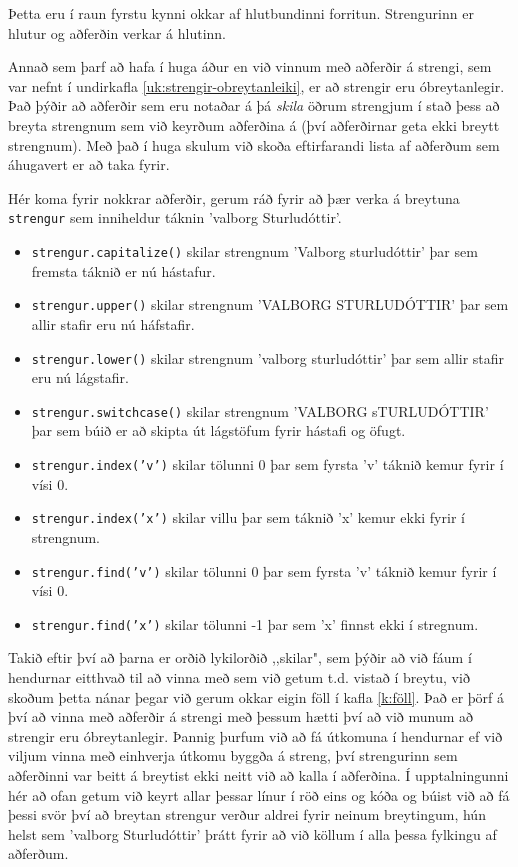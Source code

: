 Þetta eru í raun fyrstu kynni okkar af hlutbundinni forritun.
Strengurinn er hlutur og aðferðin verkar á hlutinn.

Annað sem þarf að hafa í huga áður en við vinnum með aðferðir á strengi, sem var nefnt í undirkafla \ref{uk:strengir-obreytanleiki}, er að strengir eru óbreytanlegir.
Það þýðir að aðferðir sem eru notaðar á þá \emph{skila} öðrum strengjum í stað þess að breyta strengnum sem við keyrðum aðferðina á (því aðferðirnar geta ekki breytt strengnum).
Með það í huga skulum við skoða eftirfarandi lista af aðferðum sem áhugavert er að taka fyrir.
\vspace{10px}

Hér koma fyrir nokkrar aðferðir, gerum ráð fyrir að þær verka á breytuna \texttt{strengur} sem inniheldur táknin 'valborg Sturludóttir'.
\vspace{5px}
\begin{itemize}
	\item \texttt{strengur.capitalize()} skilar strengnum 'Valborg sturludóttir' þar sem fremsta táknið er nú hástafur.
	\item \texttt{strengur.upper()} skilar strengnum 'VALBORG STURLUDÓTTIR' þar sem allir stafir eru nú háfstafir.
	\item \texttt{strengur.lower()} skilar strengnum 'valborg sturludóttir' þar sem allir stafir eru nú lágstafir.
	\item \texttt{strengur.switchcase()} skilar strengnum 'VALBORG sTURLUDÓTTIR' þar sem búið er að skipta út lágstöfum fyrir hástafi og öfugt.
	\item \texttt{strengur.index('v')} skilar tölunni 0 þar sem fyrsta 'v' táknið kemur fyrir í vísi 0.
	\item \texttt{strengur.index('x')} skilar villu þar sem táknið 'x' kemur ekki fyrir í strengnum.
	\item \texttt{strengur.find('v')} skilar tölunni 0 þar sem fyrsta 'v' táknið kemur fyrir í vísi 0.
	\item \texttt{strengur.find('x')} skilar tölunni -1 þar sem 'x' finnst ekki í stregnum. 
\end{itemize}
\vspace{10px}

Takið eftir því að þarna er orðið lykilorðið ,,skilar", sem þýðir að við fáum í hendurnar eitthvað til að vinna með sem við getum t.d. vistað í breytu, við skoðum þetta nánar þegar við gerum okkar eigin föll í kafla \ref{k:föll}.
Það er þörf á því að vinna með aðferðir á strengi með þessum hætti því að við munum að strengir eru óbreytanlegir.
Þannig þurfum við að fá útkomuna í hendurnar ef við viljum vinna með einhverja útkomu byggða á streng, því strengurinn sem aðferðinni var beitt á breytist ekki neitt við að kalla í aðferðina.
Í upptalningunni hér að ofan getum við keyrt allar þessar línur í röð eins og kóða og búist við að fá þessi svör því að breytan strengur verður aldrei fyrir neinum breytingum, hún helst sem 'valborg Sturludóttir' þrátt fyrir að við köllum í alla þessa fylkingu af aðferðum.

